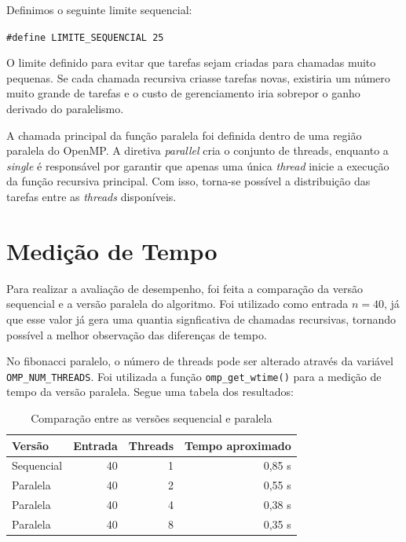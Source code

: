 \documentclass[
    12pt,
    oneside,
    a4paper,
    brazil
]{abntex2}
\begin{document}
Definimos o seguinte limite sequencial:

\begin{center}
	\texttt{\#define LIMITE\_SEQUENCIAL 25}
\end{center}

O limite definido para evitar que tarefas sejam criadas para chamadas muito pequenas. Se cada chamada recursiva criasse tarefas novas, existiria um número muito grande de tarefas e o custo de gerenciamento iria sobrepor o ganho derivado do paralelismo.

A chamada principal da função paralela foi definida dentro de uma região paralela do OpenMP. A diretiva \textit{parallel} cria o conjunto de threads, enquanto a \textit{single} é responsável por garantir que apenas uma única \textit{thread} inicie a execução da função recursiva principal. Com isso, torna-se possível a distribuição das tarefas entre as \textit{threads} disponíveis.

\chapter{Medição de Tempo}

Para realizar a avaliação de desempenho, foi feita a comparação da versão sequencial e a versão paralela do algoritmo. Foi utilizado como entrada $n = 40$, já que esse valor já gera uma quantia signficativa de chamadas recursivas, tornando possível a melhor observação das diferenças de tempo.

No fibonacci paralelo, o número de threads pode ser alterado através da variável                     \texttt{OMP\_NUM\_THREADS}. Foi utilizada a função \texttt{omp\_get\_wtime()} para a medição de tempo da versão paralela. Segue uma tabela dos resultados:

\begin{table}[h]
	\centering
	\caption{Comparação entre as versões sequencial e paralela}
	\label{tab:comparacao}
	\begin{tabular}{|l|r|r|r|}
		\hline
		\textbf{Versão} & \textbf{Entrada} & \textbf{Threads} & \textbf{Tempo aproximado} \\ \hline
		Sequencial & 40 & 1 & 0,85 s \\ \hline
		Paralela & 40 & 2 & 0,55 s \\ \hline
		Paralela & 40 & 4 & 0,38 s \\ \hline
		Paralela & 40 & 8 & 0,35 s \\ \hline
	\end{tabular}
\end{table}
\end{document}
